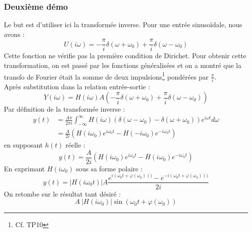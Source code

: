 \subsubsection{Deuxième démo}
Le but est d'utiliser ici la transformée inverse. Pour une entrée sinusoïdale, nous
avons :
\begin{equation}
	U(i\omega) = -\frac{\pi}{i}\delta(\omega+\omega_0) + \frac{\pi}{i}\delta(\omega-
	\omega_0)
	\label{eq:ExpErr}
\end{equation}
Cette fonction ne vérifie pas la première condition de Dirichet. Pour obtenir cette 
transformation, on est passé par les fonctions généralisées et on a  montré que la transfo 
de Fourier était la somme de deux impulsions\footnote{Cf. TP10} pondérées par 
$\frac{\pi}{i}$.\\
Après substitution dans la relation entrée-sortie :
\begin{equation}
	Y(i\omega) = H(i\omega)A\left(-\frac{\pi}{i}\delta(\omega+\omega_0) + \frac{\pi}{i}
	\delta(\omega-\omega_0)\right)
\end{equation}
Par définition de la transformée inverse :
\begin{equation}
	\begin{array}{ll}
		y(t) & = \frac{A\pi}{2\pi i}\int_{-\infty}^\infty H(i\omega)(\delta(\omega-\omega_0)- 
		\delta(\omega+\omega_0))e^{i\omega t}d\omega\\
		     & = \frac{A}{2i}(H(i\omega_0)e^{i\omega_0t} - H(-i\omega_0)e^{-i\omega_0t})      
	\end{array}
\end{equation}
en supposant $h(t)$ réelle :
\begin{equation}
	y(t) = \frac{A}{2i}(H(i\omega_0)e^{i\omega_0t} - \overline{H}(i\omega_0)e^{-i\omega_0t})
\end{equation}
En exprimant $H(i\omega_0)$ sous sa forme polaire :
\begin{equation}
	y(t) = |H(i\omega_0t)|A\frac{e^{i(\omega_0t+\varphi(\omega_0)))}-e^{-i(\omega_0t+\varphi
		(\omega_0)))}}{2i}
\end{equation}
On retombe sur le résultat tant désiré :	
\begin{equation}
	A\ |H(i\omega_0)|\sin(\omega_0t+\varphi(\omega_0))
\end{equation}
		

